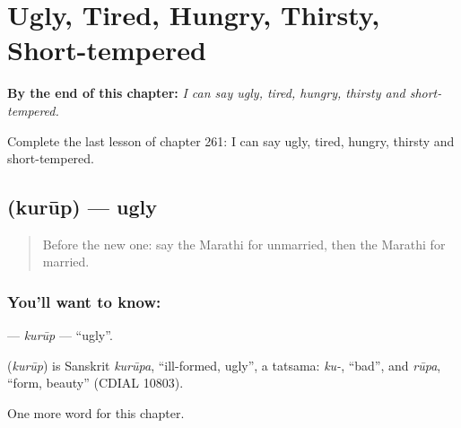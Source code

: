 
\chapter{Ugly, Tired, Hungry, Thirsty, Short-tempered}
\label{ch:mr-ugly-tired-hungry-thirsty-short-tempered}

\begin{chapteropening}
\textbf{By the end of this chapter:} \emph{I can say ugly, tired, hungry, thirsty and short-tempered.}

Complete the last lesson of chapter 261: I can say ugly, tired, hungry, thirsty and short-tempered.
\end{chapteropening}

\section[\texorpdfstring{\mr{कुरूप} (kurūp)}{कुरूप (kurūp)}]{ (kurūp) — ugly}

\label{lesson:MR-C261-kurup}



\begin{quote}
Before the new one: say the Marathi for unmarried, then the Marathi for married.
\end{quote}

\subsection*{You'll want to know: }
\textbf{} — \emph{kurūp} — \textquotedblleft{}ugly\textquotedblright{}.

\begin{cousinweb}
\textbf{} (\emph{kurūp}) is Sanskrit \emph{kurūpa}, \textquotedblleft{}ill-formed, ugly\textquotedblright{}, a tatsama: \emph{ku-}, \textquotedblleft{}bad\textquotedblright{}, and \emph{rūpa}, \textquotedblleft{}form, beauty\textquotedblright{} (CDIAL 10803).
\end{cousinweb}

\begin{grammarlens}[title={What you've built}]
One more word for this chapter.
\end{grammarlens}

